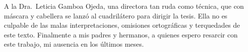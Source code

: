 \documentclass[14pt,twoside,final]{extbook} %
\begin{document}
A la Dra.~Leticia Gamboa Ojeda, una directora tan ruda como técnica, que con máscara y cabellera se lanzó al cuadrilátero para dirigir la tesis. Ella no es culpable de las malas interpretaciones, omisiones ortográficas y terquedades de este texto. Finalmente a mis padres y hermanos, a quienes espero resarcir con este trabajo, mi ausencia en los últimos meses.
\cleardoublepage %
\makeatletter
\renewcommand\@dotsep{200} %
\makeatother
\renewcommand{\contentsname}{Índice de contenidos}
\thispagestyle{empty}
\pagestyle{fancy}
\fancyhf{} %
\fancyhead[RO,LE]{\thepage}
\fancyfoot{}
\renewcommand{\headrulewidth}{0pt}
\setcounter{page}{11}
\cleardoublepage
\tableofcontents
\makeatletter
\renewcommand\@dotsep{200} %
\makeatother
\renewcommand{\listtablename}{Índice de cuadros}
\listoftables
\thispagestyle{empty}
\pagestyle{fancy}
\fancyhf{} %
\fancyhead[RO,LE]{\thepage}
\fancyfoot{}
\renewcommand{\headrulewidth}{0pt}
\setcounter{page}{13}
\makeatletter
\renewcommand\@dotsep{200} %
\makeatother
\renewcommand{\listfigurename}{Índice de imágenes}
\listoffigures
\thispagestyle{empty}
\pagestyle{fancy}
\fancyhf{} %
\fancyhead[RO,LE]{\thepage}
\fancyfoot{}
\renewcommand{\headrulewidth}{0pt}
\setcounter{page}{15}
\end{document}
